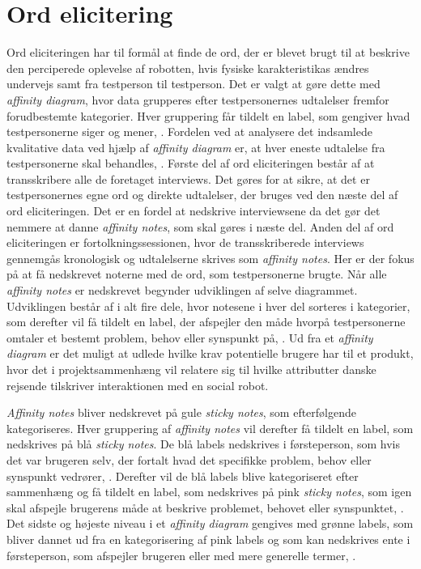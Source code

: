 \section*{Ord elicitering}
\label{OrdElicitering}
%
Ord eliciteringen har til formål at finde de ord, der er blevet brugt til at beskrive den perciperede oplevelse af robotten, hvis fysiske karakteristikas ændres undervejs samt fra testperson til testperson. Det er valgt at gøre dette med \textit{affinity diagram}, hvor data grupperes efter testpersonernes udtalelser fremfor forudbestemte kategorier. Hver gruppering får tildelt en label, som gengiver hvad testpersonerne siger og mener, \parencite[s. 159]{Book:BuildingAnAffinity}. Fordelen ved at analysere det indsamlede kvalitative data ved hjælp af \textit{affinity diagram} er, at hver eneste udtalelse fra testpersonerne skal behandles, \parencite[s. 25]{PDF:ConsolidationIdeationAffinity}. \blankline
%
Første del af ord eliciteringen består af at transskribere alle de foretaget interviews. Det gøres for at sikre, at det er testpersonernes egne ord og direkte udtalelser, der bruges ved den næste del af ord eliciteringen. Det er en fordel at nedskrive interviewsene da det gør det nemmere at danne \textit{affinity notes}, som skal gøres i næste del. \blankline
%
Anden del af ord eliciteringen er fortolkningssessionen, hvor de transskriberede interviews gennemgås kronologisk og udtalelserne skrives som \textit{affinity notes}. Her er der fokus på at få nedskrevet noterne med de ord, som testpersonerne brugte. \blankline
%
Når alle \textit{affinity notes} er nedskrevet begynder udviklingen af selve diagrammet. Udviklingen består af i alt fire dele, hvor notesene i hver del sorteres i kategorier, som derefter vil få tildelt en label, der afspejler den måde hvorpå testpersonerne omtaler et bestemt problem, behov eller synspunkt på, \parencite[s. 159]{Book:BuildingAnAffinity}. Ud fra et \textit{affinity diagram} er det muligt at udlede hvilke krav potentielle brugere har til et produkt, hvor det i projektsammenhæng vil relatere sig til hvilke attributter danske rejsende tilskriver interaktionen med en social robot. 

\textit{Affinity notes} bliver nedskrevet på gule \textit{sticky notes}, som efterfølgende kategoriseres. Hver gruppering af \textit{affinity notes} vil derefter få tildelt en label, som nedskrives på blå \textit{sticky notes}. De blå labels nedskrives i førsteperson, som hvis det var brugeren selv, der fortalt hvad det specifikke problem, behov eller synspunkt vedrører, \parencite[s. 160]{Book:BuildingAnAffinity}. Derefter vil de blå labels blive kategoriseret efter sammenhæng og få tildelt en label, som nedskrives på pink \textit{sticky notes}, som igen skal afspejle brugerens måde at beskrive problemet, behovet eller synspunktet, \parencite[s. 160]{Book:BuildingAnAffinity}. Det sidste og højeste niveau i et \textit{affinity diagram} gengives med grønne labels, som bliver dannet ud fra en kategorisering af pink labels og som kan nedskrives ente i førsteperson, som afspejler brugeren eller med mere generelle termer, \parencite[s. 160]{Book:BuildingAnAffinity}. 
%






